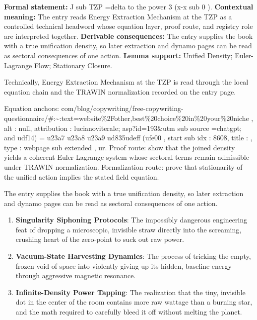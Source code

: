 \begingroup\footnotesize\setlength{\emergencystretch}{3em}\sloppy
\textbf{Formal statement:} J sub TZP =delta to the power 3 (x-x sub 0 ). \textbf{Contextual meaning:} The entry reads Energy Extraction Mechanism at the TZP as a controlled technical headword whose equation layer, proof route, and registry role are interpreted together. \textbf{Derivable consequences:} The entry supplies the book with a true unification density, so later extraction and dynamo pages can be read as sectoral consequences of one action. \textbf{Lemma support:} Unified Density; Euler-Lagrange Flow; Stationary Closure.\par
\endgroup

Technically, Energy Extraction Mechanism at the TZP is read through the local equation chain and the TRAWIN normalization recorded on the entry page.

Equation anchors: com/blog/copywriting/free-copywriting-questionnaire/\#:\textasciitilde{}:text=website\%2Fother,best\%20choice\%20in\%20your\%20niche , alt : null, attribution : lucianoviterale; asp?id=193\&utm sub source =chatgpt; and udf14) = u23a7 u23a8 u23a9 ud835udeff (ufe00 , start sub idx : 8608, title : , type : webpage sub extended , ur. Proof route: show that the joined density yields a coherent Euler-Lagrange system whose sectoral terms remain admissible under TRAWIN normalization. Formalization route: prove that stationarity of the unified action implies the stated field equation.

The entry supplies the book with a true unification density, so later extraction and dynamo pages can be read as sectoral consequences of one action.
\endgroup

\begin{enumerate}[leftmargin=1.6em,itemsep=6pt,topsep=4pt]
\item \textbf{Singularity Siphoning Protocols}: The impossibly dangerous engineering feat of dropping a microscopic, invisible straw directly into the screaming, crushing heart of the zero-point to suck out raw power.
\item \textbf{Vacuum-State Harvesting Dynamics}: The process of tricking the empty, frozen void of space into violently giving up its hidden, baseline energy through aggressive magnetic resonance.
\item \textbf{Infinite-Density Power Tapping}: The realization that the tiny, invisible dot in the center of the room contains more raw wattage than a burning star, and the math required to carefully bleed it off without melting the planet.
\end{enumerate}


